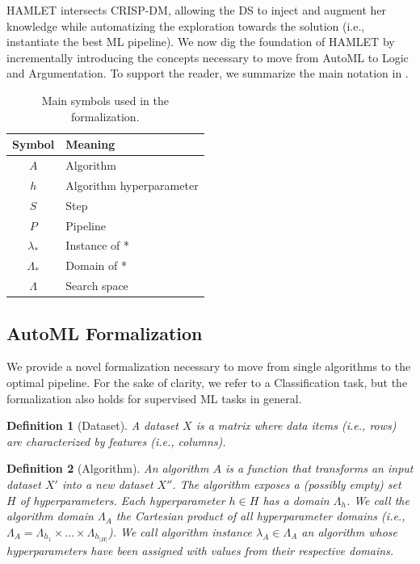 \documentclass[5p,times]{elsarticle}
\newtheorem{definition}{Definition}
\newcommand{\mf}[1]{#1}
\begin{document}
HAMLET intersects CRISP-DM, allowing the DS to inject and augment her knowledge while automatizing the exploration towards the solution (i.e., instantiate the best ML pipeline). 
We now dig the foundation of HAMLET by incrementally introducing the concepts necessary to move from AutoML to Logic and Argumentation.
To support the reader, we summarize the main notation in .

\begin{table}[t]
    \centering
    \footnotesize
    \caption{Main symbols used in the formalization.}
    \begin{tabular}{cl}
        \toprule
        \textbf{Symbol} & \textbf{Meaning} \\
        \midrule
        $A$ & Algorithm \\
        $h$ & Algorithm hyperparameter \\
        $S$ & Step \\
        $P$ & Pipeline \\
        $\lambda_*$ & Instance of * \\
        $\Lambda_*$ & Domain of * \\
        $\Lambda$ & Search space \\
        \bottomrule
    \end{tabular}
    \label{tab:symbols}
\end{table}

\subsection{AutoML Formalization}
\mf{We provide a novel formalization necessary to move from single algorithms to the optimal pipeline}.
For the sake of clarity, we refer to a Classification task, but the formalization also holds for supervised ML tasks in general. %

\begin{definition}[Dataset]
A \emph{dataset} $X$ is a matrix where data items (i.e., rows) are characterized by features (i.e., columns).
\end{definition}

\begin{definition}[Algorithm]
An \emph{algorithm} $A$ is a function that transforms an input dataset $X'$ into a new dataset $X''$.
The algorithm exposes a (possibly empty) set $H$ of \emph{hyperparameters}.
Each hyperparameter $h \in H$ has a \emph{domain} $\Lambda_h$.
We call the \emph{algorithm domain} $\Lambda_A$ the Cartesian product of all hyperparameter domains (i.e., $\Lambda_A = \Lambda_{h_1} \times \ldots \times \Lambda_{h_{|H|}}$).
We call \emph{algorithm instance} $\lambda_A \in \Lambda_A$ an algorithm whose hyperparameters have been assigned with values from their respective domains.
\end{definition}
\end{document}
